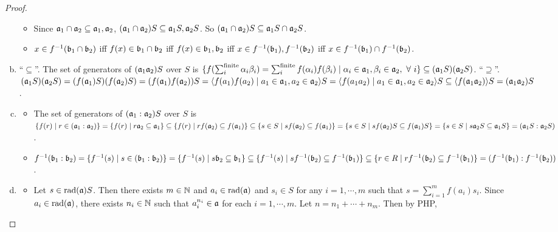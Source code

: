 \begin{proof}
\begin{enumerate}[(a)]
            \begin{itemize}
                \item Since $\mathfrak{a}_1 \cap \mathfrak{a}_2 \subseteq \mathfrak{a}_1,\mathfrak{a}_2$, $(\mathfrak{a}_1 \cap \mathfrak{a}_2)S \subseteq \mathfrak{a}_1S,\mathfrak{a}_2S$. So $(\mathfrak{a}_1 \cap \mathfrak{a}_2) S \subseteq \mathfrak{a}_1 S \cap \mathfrak{a}_2 S$.
                \item $x \in f^{-1}(\mathfrak{b}_1 \cap \mathfrak{b}_2)$ iff $f(x) \in \mathfrak{b}_1 \cap \mathfrak{b}_2$ iff $f(x) \in \mathfrak{b}_1,\mathfrak{b}_2$ iff $x \in f^{-1}(\mathfrak{b}_1),f^{-1}(\mathfrak{b}_2)$ iff $x \in f^{-1}(\mathfrak{b}_1) \cap f^{-1}(\mathfrak{b}_2)$.
            \end{itemize}
        \item 
            ``$\subseteq$''. The set of generators of $(\mathfrak{a}_1\mathfrak{a}_2)S$ over $S$ is $\{f(\sum_i^{\text{finite}}\alpha_i\beta_i) = \sum_i^{\text{finite}} f(\alpha_i)f(\beta_i) \mid \alpha_i \in \mathfrak{a}_1,\beta_i \in \mathfrak{a}_2,\ \forall \  i\} \subseteq (\mathfrak{a}_1S)(\mathfrak{a}_2S)$. ``$\supseteq$''. $(\mathfrak{a}_1S)(\mathfrak{a}_2S) = (f(\mathfrak{a}_1)S)(f(\mathfrak{a}_2)S) = (f(\mathfrak{a}_1)f(\mathfrak{a}_2))S = \langle f(a_1)f(a_2) \mid a_1 \in \mathfrak{a}_1,a_2 \in \mathfrak{a}_2 \rangle S = \langle f(a_1a_2) \mid a_1 \in \mathfrak{a}_1,a_2 \in \mathfrak{a}_2 \rangle S \subseteq \langle f(\mathfrak{a}_1\mathfrak{a}_2) \rangle S = (\mathfrak{a}_1\mathfrak{a}_2)S$. 
        \item 
            \begin{itemize}
                \item 
                    The set of generators of $(\mathfrak{a}_1:\mathfrak{a}_2)S$ over $S$ is $\{f(r) \mid r \in (\mathfrak{a}_1:\mathfrak{a}_2)\} = \{f(r) \mid r \mathfrak{a}_2 \subseteq \mathfrak{a}_1\} \subseteq \{f(r) \mid r f(\mathfrak{a}_2) \subseteq f(\mathfrak{a}_1)\} \subseteq \{s \in S \mid sf(\mathfrak{a}_2) \subseteq f(\mathfrak{a}_1)\} = \{s \in S \mid s f(\mathfrak{a}_2)S \subseteq f(\mathfrak{a}_1)S \} = \{s \in S \mid s \mathfrak{a}_2 S \subseteq \mathfrak{a}_1 S\} = (\mathfrak{a}_1S:\mathfrak{a}_2S)$.
                \item $f^{-1}(\mathfrak{b}_1:\mathfrak{b}_2) = \{f^{-1}(s) \mid s \in (\mathfrak{b}_1:\mathfrak{b}_2)\} = \{f^{-1}(s) \mid s\mathfrak{b}_2 \subseteq \mathfrak{b}_1\} \subseteq \{f^{-1}(s) \mid sf^{-1}(\mathfrak{b}_2) \subseteq f^{-1}(\mathfrak{b}_1)\} \subseteq \{r \in R\mid rf^{-1}(\mathfrak{b}_2) \subseteq f^{-1}(\mathfrak{b}_1)\} = (f^{-1}(\mathfrak{b}_1):f^{-1}(\mathfrak{b}_2))$.
            \end{itemize}
        \item 
            \begin{itemize}
                \item Let $s \in \operatorname{rad}(\mathfrak{a})S$. Then there exists $m \in \mathbb{N}$ and $a_i \in \operatorname{rad}(\mathfrak{a})$ and $s_i \in S$ for any $i = 1,\cdots,m$ such that $s = \sum_{i=1}^m f(a_i)s_i$. Since $a_i \in \operatorname{rad}(\mathfrak{a})$, there exists $n_i \in \mathbb{N}$ such that $a_i^{n_i} \in \mathfrak{a}$ for each $i = 1,\cdots,m$. Let $n = n_1 + \cdots + n_m$. Then by PHP, 

\end{itemize}
\end{enumerate}
\end{proof}
